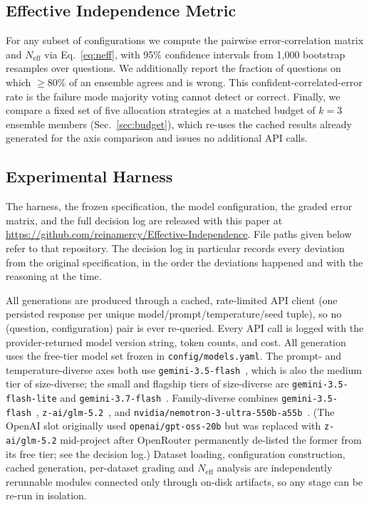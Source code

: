 \documentclass[conference]{IEEEtran}
\newcommand{\repourl}{\url{https://github.com/reinamercy/Effective-Independence}}
\begin{document}
\subsection{Effective Independence Metric}
For any subset of configurations we compute the pairwise error-correlation
matrix and $N_\text{eff}$ via Eq.~\ref{eq:neff}, with 95\% confidence
intervals from 1{,}000 bootstrap resamples over questions. We additionally
report the fraction of questions on which $\geq$80\% of an ensemble agrees
and is wrong. This confident-correlated-error rate is the failure mode
majority voting cannot detect or correct. Finally, we compare a fixed set of five
allocation strategies at a matched budget of $k=3$ ensemble members
(Sec.~\ref{sec:budget}), which re-uses the cached results already
generated for the axis comparison and issues no additional API calls.

\subsection{Experimental Harness}
\label{sec:harness}
The harness, the frozen specification, the model configuration, the graded
error matrix, and the full decision log are released with this paper at
\repourl. File paths given below refer to that repository. The decision log
in particular records every deviation from the original specification, in
the order the deviations happened and with the reasoning at the time.

All generations are produced through a cached, rate-limited API client
(one persisted response per unique model/prompt/temperature/seed tuple),
so no (question, configuration) pair is ever re-queried. Every API call is
logged with the provider-returned model version string, token counts, and
cost. All generation uses the free-tier model set frozen in
\texttt{config/models.yaml}. The prompt- and temperature-diverse axes both
use \texttt{gemini-3.5-flash}~\cite{geminiteam2023}, which is also the
medium tier of size-diverse; the small and flagship tiers of size-diverse
are \texttt{gemini-3.5-\allowbreak flash-lite} and
\texttt{gemini-3.7-flash}~\cite{geminiteam2023}. Family-diverse combines
\texttt{gemini-3.5-flash}~\cite{geminiteam2023},
\texttt{z-ai/\allowbreak glm-5.2}~\cite{glmteam2026}, and
\texttt{nvidia/\allowbreak nemotron-3-\allowbreak ultra-550b-a55b}~\cite{nemotron2026ultra}.
(The OpenAI slot originally used
\texttt{openai/gpt-oss-20b} but was replaced with \texttt{z-ai/glm-5.2}
mid-project after OpenRouter permanently de-listed the former from its
free tier; see the decision log.) Dataset loading, configuration
construction, cached generation, per-dataset grading and $N_\text{eff}$
analysis are independently rerunnable modules connected only through on-disk
artifacts, so any stage can be re-run in isolation.
\end{document}
